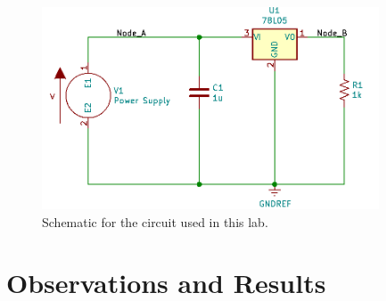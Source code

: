 \documentclass{article}
\begin{document}
\begin{figure}[H]
	\begin{center}
		\includegraphics[width=10cm]{lab2schematic.png}
	\end{center}
	\caption{Schematic for the circuit used in this lab.}
\end{figure}

\section{Observations and Results}
\end{document}
